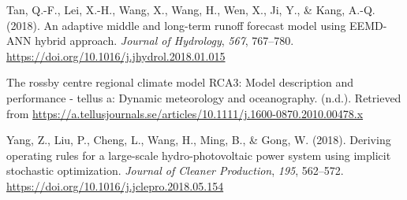 \documentclass[
]{agujournal2019}
\newlength{\cslhangindent}
\newlength{\cslentryspacingunit} %
\newenvironment{CSLReferences}[2] %
 {%
  \setlength{\parindent}{0pt}
  \ifodd #1
  \let\oldpar\par
  \def\par{\hangindent=\cslhangindent\oldpar}
  \fi
  \setlength{\parskip}{#2\cslentryspacingunit}
 }%
 {}
\begin{document}
\begin{CSLReferences}{1}{0}
\leavevmode{}%
Tan, Q.-F., Lei, X.-H., Wang, X., Wang, H., Wen, X., Ji, Y., \& Kang,
A.-Q. (2018). An adaptive middle and long-term runoff forecast model
using {EEMD-ANN} hybrid approach. \emph{Journal of Hydrology},
\emph{567}, 767--780.
\url{https://doi.org/10.1016/j.jhydrol.2018.01.015}

\leavevmode{}%
The rossby centre regional climate model RCA3: Model description and
performance - tellus a: Dynamic meteorology and oceanography. (n.d.).
Retrieved from
\url{https://a.tellusjournals.se/articles/10.1111/j.1600-0870.2010.00478.x}

\leavevmode{}%
Yang, Z., Liu, P., Cheng, L., Wang, H., Ming, B., \& Gong, W. (2018).
Deriving operating rules for a large-scale hydro-photovoltaic power
system using implicit stochastic optimization. \emph{Journal of Cleaner
Production}, \emph{195}, 562--572.
\url{https://doi.org/10.1016/j.jclepro.2018.05.154}

\end{CSLReferences}
\end{document}

